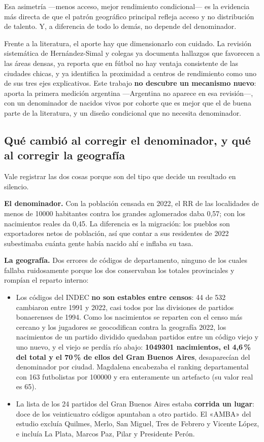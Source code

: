 \documentclass[11pt,a4paper]{article}
\begin{document}
Esa asimetría —menos acceso, mejor rendimiento condicional— es la evidencia más
directa de que el patrón geográfico principal refleja acceso y no distribución de
talento. Y, a diferencia de todo lo demás, no depende del denominador.

Frente a la literatura, el aporte hay que dimensionarlo con cuidado. La revisión
sistemática de Hernández-Simal y colegas \cite{revision2024} ya documenta
hallazgos que favorecen a las áreas densas, ya reporta que en fútbol no hay
ventaja consistente de las ciudades chicas, y ya identifica la proximidad a
centros de rendimiento como uno de sus tres ejes explicativos. Este trabajo
\textbf{no descubre un mecanismo nuevo}: aporta la primera medición argentina
—Argentina no aparece en esa revisión—, con un denominador de nacidos vivos por
cohorte que es mejor que el de buena parte de la literatura, y un diseño
condicional que no necesita denominador.

\subsection{Qué cambió al corregir el denominador, y qué al corregir la geografía}

Vale registrar las dos cosas porque son del tipo que decide un resultado en
silencio.

\textbf{El denominador.} Con la población censada en 2022, el RR de las
localidades de menos de \num{10000} habitantes contra los grandes aglomerados daba
0,57; con los nacimientos reales da 0,45. La diferencia es la migración: los
pueblos son exportadores netos de población, así que contar a sus residentes de
2022 subestimaba cuánta gente había nacido ahí e inflaba su tasa.

\textbf{La geografía.} Dos errores de códigos de departamento, ninguno de los
cuales fallaba ruidosamente porque los dos conservaban los totales provinciales y
rompían el reparto interno:

\begin{itemize}[leftmargin=1.4em,itemsep=0.25em]
  \item Los códigos del INDEC \textbf{no son estables entre censos}: 44 de 532
    cambiaron entre 1991 y 2022, casi todos por las divisiones de partidos
    bonaerenses de 1994. Como los nacimientos se reparten con el censo más cercano
    y los jugadores se geocodifican contra la geografía 2022, los nacimientos de un
    partido dividido quedaban partidos entre un código viejo y uno nuevo, y el
    viejo se perdía río abajo: \textbf{\num{1049301} nacimientos, el 4,6\,\% del
    total y el 70\,\% de ellos del Gran Buenos Aires}, desaparecían del denominador
    por ciudad. Magdalena encabezaba el ranking departamental con 163 futbolistas
    por \num{100000} y era enteramente un artefacto (su valor real es 65).
  \item La lista de los 24 partidos del Gran Buenos Aires estaba \textbf{corrida un
    lugar}: doce de los veinticuatro códigos apuntaban a otro partido. El «AMBA»
    del estudio excluía Quilmes, Merlo, San Miguel, Tres de Febrero y Vicente
    López, e incluía La Plata, Marcos Paz, Pilar y Presidente Perón.
\end{itemize}
\end{document}
